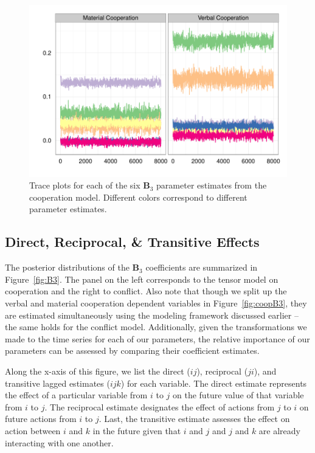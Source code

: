 \documentclass[3p,times,twocolumn,authoryear,12pt]{elsarticle}
\newcommand{\bl}[1]{{\mathbf #1}}
\begin{document}
\begin{figure}[ht]
	\centering
	\includegraphics[width=.45\textwidth]{Coop_trace}
	\caption{Trace plots for each of the six $\bl B_3$ parameter estimates from the cooperation model. Different colors correspond to different parameter estimates.}
	\label{fig:trace}
\end{figure}

\subsection{Direct, Reciprocal, \& Transitive Effects}

The posterior distributions of the $\bl B_3$ coefficients are summarized in Figure~\ref{fig:B3}. The panel on the left corresponds to the tensor model on cooperation and the right to conflict. Also note that though we split up the verbal and material cooperation dependent variables in Figure~\ref{fig:coopB3}, they are estimated simultaneously using the modeling framework discussed earlier -- the same holds for the conflict model. Additionally, given the transformations we made to the time series for each of our parameters, the relative importance of our parameters can be assessed by comparing their coefficient estimates.

Along the x-axis of this figure, we list the direct ($ij$), reciprocal ($ji$), and transitive lagged estimates ($ijk$) for each variable. The direct estimate represents the effect of a particular variable from $i$ to $j$ on the future value of that variable from $i$ to $j$. The reciprocal estimate designates the effect of actions from $j$ to $i$ on future actions from $i$ to $j$. Last, the transitive estimate assesses the effect on action between $i$ and $k$ in the future given that $i$ and $j$ and $j$ and $k$ are already interacting with one another.
\end{document}
